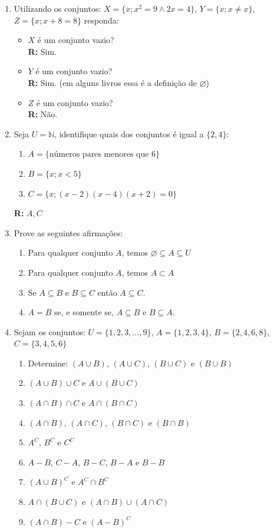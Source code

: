 \documentclass[oneside,a4paper,12pt]{article}
\begin{document}
\begin{enumerate}



	\item Utilizando os conjuntos: $X = \{ x; x^2 = 9 \land 2x=4\}$, $Y=\{x; x\neq x\}$, $Z = \{x; x+8 = 8\}$ responda:
	\begin{itemize}
		\item $X$ é um conjunto vazio? \\ {\bf R:} Sim.
		\item $Y$ é um conjunto vazio? \\ {\bf R:} Sim. (em alguns livros essa é a definição de $\varnothing$)
		\item $Z$ é um conjunto vazio? \\ {\bf R:} Não.
	\end{itemize}

	\item Seja $U = \mathbb{N}$, identifique quais dos conjuntos é igual a $\{2,4\}$:
	\begin{enumerate}
		\item $A = \{ \text{números pares menores que } 6\}$
		\item $B = \{ x; x<5 \}$
		\item $C = \{x; (x-2)(x-4)(x+2) = 0\}$ 
	\end{enumerate}
	{\bf R:} $A, C$
	
	\item Prove as seguintes afirmações:
	\begin{enumerate}
		\item Para qualquer conjunto $A$, temos $\varnothing \subseteq A \subseteq U$
		\item Para qualquer conjunto $A$, temos $A \subset A$
		\item Se $A \subseteq B$ e $B \subseteq C$ então $A \subseteq C$.
		\item $A=B$ se, e somente se, $A \subseteq B$ e $B \subseteq A$.
	\end{enumerate}

	\item Sejam os conjuntos: $U = \{ 1,2,3,\dots,9\}$, $A= \{1,2,3,4\}$, $B = \{2,4,6,8\}$, $C=\{3,4,5,6\}$
	\begin{enumerate}
		\item Determine: $(A \cup B)$, $(A \cup C)$, $(B \cup C)$ e $(B \cup B)$
		\item $(A \cup B)\cup C$ e $A \cup (B \cup C)$
		\item $(A \cap B)\cap C$ e $A \cap (B \cap C)$
		\item $(A \cap B)$, $(A \cap C)$, $(B \cap C)$ e $(B \cap B)$
		\item $A^{C}$, $B^{C}$ e $C^{C}$
		\item $A-B$, $C-A$, $B-C$, $B-A$ e $B-B$
		\item $(A \cup B)^{C}$ e $A^{C} \cap B^{C}$
		\item $A \cap (B \cup C)$ e $(A \cap B)\cup(A\cap C)$
		\item $(A \cap B)-C$ e $(A - B)^{C}$
	\end{enumerate}


\end{enumerate}
\end{document}
